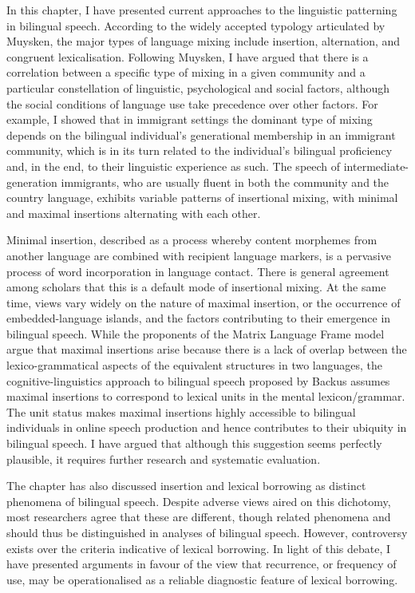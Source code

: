 In this chapter, I have presented current approaches to the linguistic patterning in bilingual speech. According to the widely accepted typology articulated by Muysken, the major types of language mixing include insertion, alternation, and congruent lexicalisation. Following Muysken, I have argued that there is a correlation between a specific type of mixing in a given community and a particular constellation of linguistic, psychological and social factors, although the social conditions of language use take precedence over other factors. For example, I showed that in immigrant settings the dominant type of mixing depends on the bilingual individual's generational membership in an immigrant community, which is in its turn related to the individual's bilingual proficiency and, in the end, to their linguistic experience as such. The speech of intermediate-generation immigrants, who are usually fluent in both the community and the country language, exhibits variable patterns of insertional mixing, with minimal and maximal insertions alternating with each other.

Minimal insertion, described as a process whereby content morphemes from another language are combined with  recipient language markers, is a pervasive process of word incorporation in language contact. There is general agreement among scholars that this is a default mode of insertional mixing. At the same time, views vary widely on the nature of maximal insertion, or the occurrence of embedded-language islands, and the factors contributing to their emergence in bilingual speech. While the proponents of the Matrix Language Frame model argue that maximal insertions arise because there is a lack of overlap between the lexico-grammatical aspects of the equivalent structures in two languages, the cognitive-linguistics approach to bilingual speech proposed by Backus assumes maximal insertions to correspond to lexical units in the mental lexicon/grammar. The unit status makes maximal insertions highly accessible to bilingual individuals in online speech production and hence contributes to their ubiquity in bilingual speech. I have argued that although this suggestion seems perfectly plausible, it requires further research and systematic evaluation.

The chapter has also discussed insertion and lexical borrowing as distinct phenomena of bilingual speech. Despite adverse views aired on this dichotomy, most researchers agree that these are different, though related phenomena and should thus be distinguished in analyses of bilingual speech. However, controversy exists over the criteria indicative of lexical borrowing. In light of this debate, I have presented arguments in favour of the view that recurrence, or frequency of use, may be operationalised as a reliable diagnostic feature of lexical borrowing.

